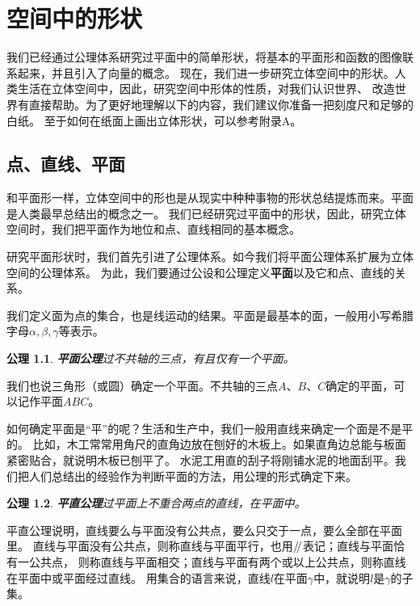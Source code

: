 \documentclass[12pt,UTF8]{ctexbook}
\newtheorem{po}{公理}
\renewcommand\parallel{\mathrel{/\mskip-4mu/}}
\begin{document}
\chapter{空间中的形状}

我们已经通过公理体系研究过平面中的简单形状，将基本的平面形和函数的图像联系起来，并且引入了向量的概念。
现在，我们进一步研究立体空间中的形状。人类生活在立体空间中，因此，研究空间中形体的性质，对我们认识世界、
改造世界有直接帮助。为了更好地理解以下的内容，我们建议你准备一把刻度尺和足够的白纸。
至于如何在纸面上画出立体形状，可以参考附录A。

\section{点、直线、平面}

和平面形一样，立体空间中的形也是从现实中种种事物的形状总结提炼而来。平面是人类最早总结出的概念之一。
我们已经研究过平面中的形状，因此，研究立体空间时，我们把平面作为地位和点、直线相同的基本概念。

研究平面形状时，我们首先引进了公理体系。如今我们将平面公理体系扩展为立体空间的公理体系。
为此，我们要通过公设和公理定义\textbf{平面}以及它和点、直线的关系。

我们定义面为点的集合，也是线运动的结果。平面是最基本的面，一般用小写希腊字母$\alpha,\beta,\gamma$等表示。
\begin{po}{\textbf{平面公理}}\label{po:0}
    过不共轴的三点，有且仅有一个平面。
\end{po}

我们也说三角形（或圆）确定一个平面。不共轴的三点$A$、$B$、$C$确定的平面，可以记作平面$ABC$。

如何确定平面是“平”的呢？生活和生产中，我们一般用直线来确定一个面是不是平的。
比如，木工常常用角尺的直角边放在刨好的木板上。如果直角边总能与板面紧密贴合，就说明木板已刨平了。
水泥工用直的刮子将刚铺水泥的地面刮平。我们把人们总结出的经验作为判断平面的方法，用公理的形式确定下来。
\begin{po}{\textbf{平直公理}}\label{po:1}
    过平面上不重合两点的直线，在平面中。
\end{po}
平直公理说明，直线要么与平面没有公共点，要么只交于一点，要么全部在平面里。
直线与平面没有公共点，则称直线与平面平行，也用$\parallel$表记；直线与平面恰有一公共点，
则称直线与平面相交；直线与平面有两个或以上公共点，则称直线在平面中或平面经过直线。
用集合的语言来说，直线$l$在平面$\gamma$中，就说明$l$是$\gamma$的子集。

\end{document}
